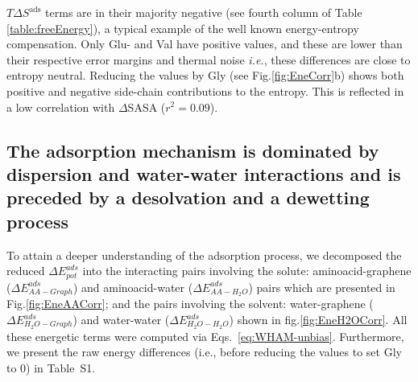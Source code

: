 \documentclass[journal=jcisd8,manuscript=article,layout=twocolumn]{achemso}
\begin{document}
$T\Delta S^{\textrm{ads}}$ terms are in their majority negative (see fourth column of Table \ref{table:freeEnergy}), a typical example of the well known energy-entropy compensation.\cite{Liu2001,Leung2008,Chodera2013,Ryde2014,Fox2018}
Only Glu- and Val have positive values, and these are lower than their respective error margins and  thermal noise \textit{i.e.}, these differences are close to entropy neutral.
Reducing the values by Gly (see Fig.\ref{fig:EneCorr}b) shows both positive and negative side-chain contributions to the entropy.
This is reflected in a low correlation with $\Delta$SASA ($r^2= 0.09$).



\subsection{The adsorption mechanism is dominated by dispersion and water-water interactions and is preceded by a desolvation and a dewetting process}

To attain a deeper understanding of the adsorption process,  we decomposed the reduced $\Delta E^{ads}_{pot}$ into the interacting pairs involving the solute: aminoacid-graphene ($\Delta E^{ads}_{AA-Graph}$) and aminoacid-water ($\Delta E^{ads}_{AA-H_2O}$) pairs  which are presented in Fig.\ref{fig:EneAACorr}; and the pairs involving the solvent: water-graphene ($\Delta E^{ads}_{H_2O-Graph}$) and water-water ($\Delta E^{ads}_{H_2O-H_2O}$) shown in fig.\ref{fig:EneH2OCorr}. All these energetic terms were computed via  Eqs.~\ref{eq:WHAM-unbias}. Furthermore, we present the raw energy differences (i.e., before reducing the values to set Gly to 0) in Table~S1.
\end{document}
